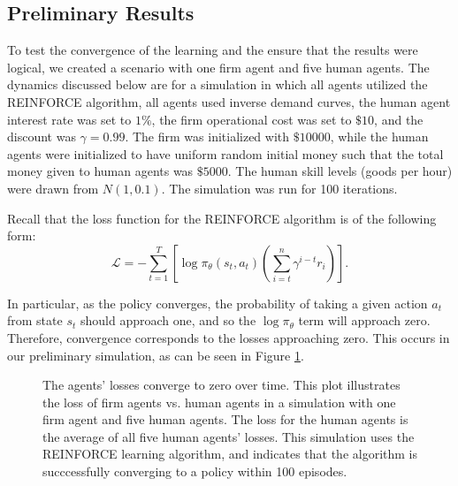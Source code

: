\documentclass[twoside,twocolumn]{article}
\begin{document}
\subsection{Preliminary Results}

To test the convergence of the learning and the ensure that the results were logical, we created a scenario with one firm agent and five human agents. The dynamics discussed below are for a simulation in which all agents utilized the REINFORCE algorithm, all agents used inverse demand curves, the human agent interest rate was set to $1\%$, the firm operational cost was set to $\$10$, and the discount was $\gamma = 0.99$. The firm was initialized with $\$10000$, while the human agents were initialized to have uniform random initial money such that the total money given to human agents was $\$5000$. The human skill levels (goods per hour) were drawn from $N(1, 0.1)$. The simulation was run for 100 iterations. 

\medskip 

Recall that the loss function for the REINFORCE algorithm is of the following form:
\[
  \mathcal{L} = -\sum_{t = 1}^T \left[\log \pi_\theta(s_t, a_t) \left( \sum_{i = t}^n \gamma^{i - t}r_i \right) \right].  
\]

In particular, as the policy converges, the probability of taking a given action $a_t$ from state $s_t$ should approach one, and so the $\log \pi_\theta$ term will approach zero. Therefore, convergence corresponds to the losses approaching zero. This occurs in our preliminary simulation, as can be seen in Figure \ref{plt:losstozero}.

\begin{figure}[h]
\caption{The agents' losses converge to zero over time. This plot illustrates the loss of firm agents vs. human agents in a simulation with one firm agent and five human agents. The loss for the human agents is the average of all five human agents' losses. This simulation uses the REINFORCE learning algorithm, and indicates that the algorithm is succcessfully converging to a policy within 100 episodes.}
\label{plt:losstozero}
\end{figure}
\end{document}
